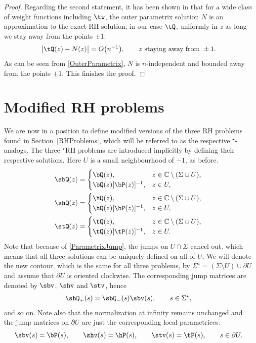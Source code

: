 \begin{proof}
Regarding the second statement, it has been shown in \cite[Section~7]{KMVV} that for a wide class of weight functions including $\tw$, the outer parametrix solution $N$ is an approximation to the exact RH solution, in our case $\tQ$, uniformly in $z$ as long we stay away from the points $\pm 1$:
\begin{align*}
 \big|\tQ(z)-N(z)\big| = O\big(n^{-1}\big), \qquad z \mbox{ staying away from } \pm 1.
\end{align*}
As can be seen from \eqref{OuterParametrix}, $N$ is $n$-independent and bounded away from the points $\pm 1$. This finishes the proof.
\end{proof}

\section{Modified RH problems}\label{ModifiedRHP}
We are now in a position to define modified versions of the three RH problems found in Section~\ref{RHProblems}, which will be referred to as the respective ${}^\star$-analogs. The three ${}^\star$RH problems are introduced implicitly by defining their respective solutions. Here $U$ is a small neighbourhood of $-1$, as before.
\begin{align*}
 \sbQ(z) &= \begin{cases}
 \bQ(z), & z \in \mathbb{C} \setminus (\Sigma \cup U),
 \\
 \bQ(z) [\bP(z)]^{-1}, & z \in U,
 \end{cases}
 \\
 \shQ(z) &= \begin{cases}
 \hQ(z), & z \in \mathbb{C} \setminus (\Sigma \cup U),
 \\
 \hQ(z) [\hP(z)]^{-1}, & z \in U,
 \end{cases}
 \\
 \stQ(z) &=
 \begin{cases}
 \tQ(z), & z \in \mathbb{C} \setminus (\Sigma \cup U),
 \\
 \tQ(z) [\tP(z)]^{-1}, & z \in U.
 \end{cases}
\end{align*}
Note that because of \eqref{ParametrixJump}, the jumps on $U \cap \Sigma$ cancel out, which means that all three solutions can be uniquely defined on all of $U$. We will denote the new contour, which is the same for all three problems, by $\Sigma^\star = (\Sigma \setminus U) \cup \partial U$ and assume that $\partial U$ is oriented clockwise. The corresponding jump matrices are denoted by $\sbv$, $\shv$ and $\stv$, hence
\begin{align*}
 \sbQ_+(s) = \sbQ_-(s)\sbv(s), \qquad s\in \Sigma^\star,
\end{align*}
and so on. Note also that the normalization at infinity remains unchanged and the jump matrices on $\partial U$ are just the corresponding local parametrices:
\begin{align*}
 \sbv(s) = \bP(s), \qquad \shv(s) = \hP(s), \qquad \stv(s) = \tP(s), \qquad s \in \partial U.
\end{align*}

